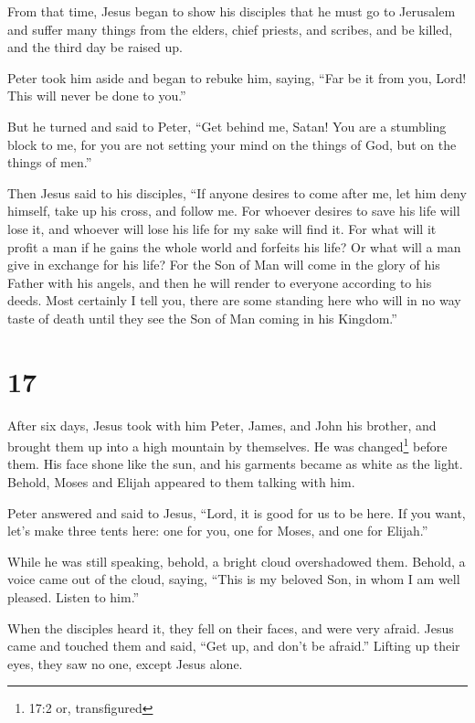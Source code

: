  From that time, Jesus began to show his disciples that he
must go to Jerusalem and suffer many things from the elders, chief
priests, and scribes, and be killed, and the third day be raised up.

 Peter took him aside and began to rebuke him, saying,
``Far be it from you, Lord! This will never be done to you.''

 But he turned and said to Peter, ``Get behind me, Satan!
You are a stumbling block to me, for you are not setting your mind on
the things of God, but on the things of men.''

 Then Jesus said to his disciples, ``If anyone desires to
come after me, let him deny himself, take up his cross, and follow me.
 For whoever desires to save his life will lose it, and
whoever will lose his life for my sake will find it.  For
what will it profit a man if he gains the whole world and forfeits his
life? Or what will a man give in exchange for his life? 
For the Son of Man will come in the glory of his Father with his angels,
and then he will render to everyone according to his deeds.
 Most certainly I tell you, there are some standing here
who will in no way taste of death until they see the Son of Man coming
in his Kingdom.''

\hypertarget{section-16}{%
\section{17}\label{section-16}}

 After six days, Jesus took with him Peter, James, and John
his brother, and brought them up into a high mountain by themselves.
 He was changed\footnote{17:2 or, transfigured} before them.
His face shone like the sun, and his garments became as white as the
light.  Behold, Moses and Elijah appeared to them talking
with him.

 Peter answered and said to Jesus, ``Lord, it is good for us
to be here. If you want, let's make three tents here: one for you, one
for Moses, and one for Elijah.''

 While he was still speaking, behold, a bright cloud
overshadowed them. Behold, a voice came out of the cloud, saying, ``This
is my beloved Son, in whom I am well pleased. Listen to him.''

 When the disciples heard it, they fell on their faces, and
were very afraid.  Jesus came and touched them and said,
``Get up, and don't be afraid.''  Lifting up their eyes,
they saw no one, except Jesus alone.

